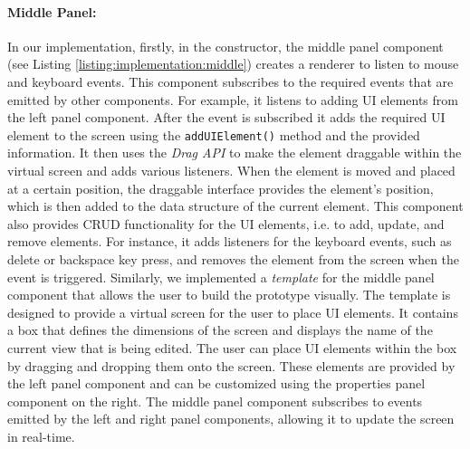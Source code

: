 \paragraph{Middle Panel:}
In our implementation, firstly, in the constructor, the middle panel component (see Listing \ref{listing:implementation:middle}) creates a renderer to listen to mouse and keyboard events.
This component subscribes to the required events that are emitted by other components. 
For example, it listens to adding UI elements from the left panel component. 
After the event is subscribed it adds the required UI element to the screen using the \texttt{addUIElement()} method and the provided information.
It then uses the \textit{Drag API} to make the element draggable within the virtual screen and adds various listeners.
When the element is moved and placed at a certain position, the draggable interface provides the element's position, which is then added to the data structure of the current element.  
This component also provides CRUD functionality for the UI elements, i.e. to add, update, and remove elements.
For instance, it adds listeners for the keyboard events, such as delete or backspace key press, and removes the element from the screen when the event is triggered.
Similarly, we implemented a \textit{template} for the middle panel component that allows the user to build the prototype visually. 
The template is designed to provide a virtual screen for the user to place UI elements. 
It contains a box that defines the dimensions of the screen and displays the name of the current view that is being edited. 
The user can place UI elements within the box by dragging and dropping them onto the screen. 
These elements are provided by the left panel component and can be customized using the properties panel component on the right. 
The middle panel component subscribes to events emitted by the left and right panel components, allowing it to update the screen in real-time.


